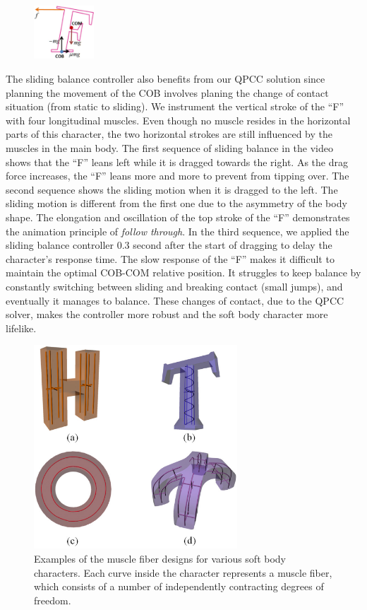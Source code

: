 \begin{figure}
\center
\hspace{-20pt}
\includegraphics[width=0.2\textwidth]{figures/SlideController.eps}
\end{figure}

The sliding balance controller also benefits from our QPCC
solution since planning the movement of the COB involves planing the
change of contact situation (from static to sliding).  We instrument the vertical stroke of the ``F'' with four
longitudinal muscles. Even though no muscle resides in the horizontal
parts of this character, the two horizontal strokes are still
influenced by the muscles in the main body. The first sequence of
sliding balance in the video shows that the ``F'' leans left while it is
dragged towards the right.  As the drag force increases, the ``F'' leans more
and more to prevent from tipping over. The second sequence shows the
sliding motion when it is dragged to the left. The sliding motion is
different from the first one due to the asymmetry of the body
shape. The elongation and oscillation of the top stroke of the ``F''
demonstrates the animation principle of \emph{follow through}. In the
third sequence, we applied the sliding balance controller 0.3 second
after the start of dragging to delay the character's
response time. The slow response of the ``F'' makes it difficult to
maintain the optimal COB-COM relative position. It struggles to keep
balance by constantly switching between sliding and breaking contact
(small jumps), and eventually it manages to balance.  These changes of
contact, due to the QPCC solver, makes the controller more robust and
the soft body character more lifelike.

\begin{figure}[!b]
\centering
\includegraphics[width=3in]{figures/muscles2.eps}
\caption{Examples of the muscle fiber designs for various soft body characters. Each curve inside the character represents a muscle fiber, which consists of a number of independently contracting degrees of freedom.}
\label{fig:muscles}
\end{figure}

